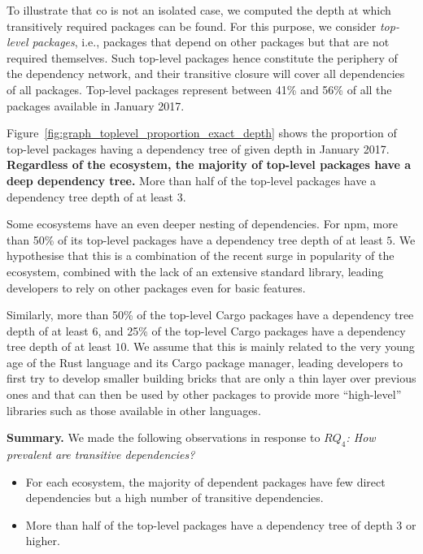 \documentclass[smallextended]{svjour3}       %
\newcommand{\ie}{i.e.,\xspace}
\newcommand{\fig}[1]{Figure~\ref{#1}}
\newcommand{\cargo}{\textsf{Cargo}\xspace}
\newcommand{\npm}{\textsf{npm}\xspace}
\newcommand{\rust}{\textsf{Rust}\xspace}
\begin{document}

To illustrate that \textsf{co} is not an isolated case, we computed the depth at which transitively required packages can be found. 
For this purpose, we consider \emph{top-level packages}, \ie packages that depend on other packages but that are not required themselves. 
Such top-level packages hence constitute the periphery of the dependency network, and their transitive closure will cover all dependencies of all packages.
Top-level packages represent between 41\% and 56\% of all the packages available in January 2017. 

\fig{fig:graph_toplevel_proportion_exact_depth} shows the proportion of top-level packages having a dependency tree of given depth in January 2017. 
\textbf{Regardless of the ecosystem, the majority of top-level packages have a deep dependency tree.} More than half of the top-level packages have a dependency tree depth of at least $3$. 

Some ecosystems have an even deeper nesting of dependencies. 
For \npm, more than 50\% of its top-level packages have a dependency tree depth of at least $5$.
We hypothesise that this is a combination of the recent surge in popularity of the ecosystem, combined with the lack of an extensive standard library, leading developers to rely on other packages even for basic features. 

Similarly, more than 50\% of the top-level \cargo packages have a dependency tree depth of at least $6$, and 25\% of the top-level \cargo packages have a dependency tree depth of at least $10$.
We assume that this is mainly related to the very young age of the \rust language and its \cargo package manager, leading developers to first try to develop smaller building bricks that are only a thin layer over previous ones and that can then be used by other packages to provide more ``high-level'' libraries such as those available in other languages.


\begin{mdframed}
\textbf{Summary.} We made the following observations in response to \emph{$RQ_4$: How prevalent are transitive dependencies?}
\begin{itemize}
\item For each ecosystem, the majority of dependent packages have few direct dependencies but a high number of transitive dependencies.
\item More than half of the top-level packages have a dependency tree of depth 3 or higher.
\end{itemize}
\end{mdframed}
\end{document}
